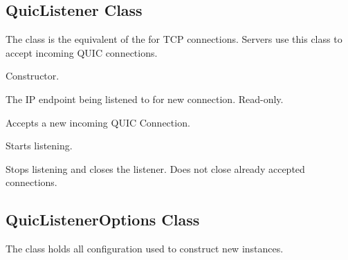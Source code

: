 \subsection{QuicListener Class}

The  class is the equivalent of the  for TCP connections.
Servers use this class to accept incoming QUIC connections.

\begin{description}

     Constructor.

     The IP endpoint being listened to for new
connection. Read-only.

Accepts a new incoming QUIC Connection.

     Starts listening.

     Stops listening and closes the listener. Does not close
already accepted connections.

\end{description}

\subsection{QuicListenerOptions Class}

The  class holds all configuration used to construct new
 instances.

